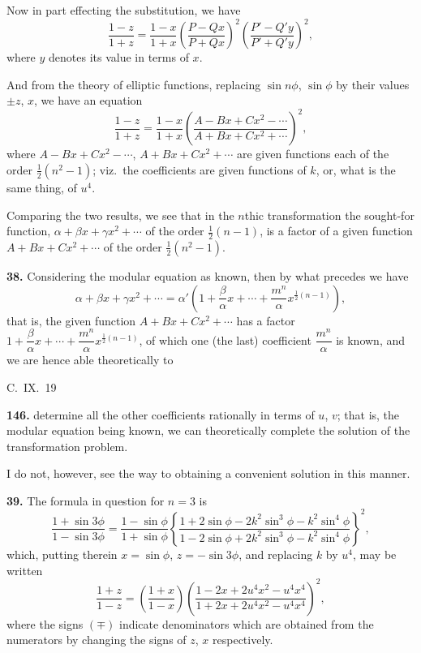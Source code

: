 \documentclass[11pt,a4paper]{article}
\theoremstyle{plain}
\begin{document}
Now in part effecting the substitution, we have
\[
\frac{1 - z}{1 + z} = \frac{1 - x}{1 + x}\left(\frac{P - Qx}{P + Qx}\right)^2\left(\frac{P' - Q'y}{P' + Q'y}\right)^2,
\]
where $y$ denotes its value in terms of $x$.

And from the theory of elliptic functions, replacing $\sin n\phi$, $\sin\phi$ by their values $\pm z$, $x$, we have an equation
\[
\frac{1 - z}{1 + z} = \frac{1 - x}{1 + x}\left(\frac{A - Bx + Cx^2 - \cdots}{A + Bx + Cx^2 + \cdots}\right)^2,
\]
where $A - Bx + Cx^2 - \cdots$, $A + Bx + Cx^2 + \cdots$ are given functions each of the order $\frac{1}{2}(n^2 - 1)$; viz.\ the coefficients are given functions of $k$, or, what is the same thing, of $u^4$.

Comparing the two results, we see that in the $n$thic transformation the sought-for function, $\alpha + \beta x + \gamma x^2 + \cdots$ of the order $\frac{1}{2}(n - 1)$, is a factor of a given function $A + Bx + Cx^2 + \cdots$ of the order $\frac{1}{2}(n^2 - 1)$.

\medskip
\noindent\textbf{38.} Considering the modular equation as known, then by what precedes we have
\[
\alpha + \beta x + \gamma x^2 + \cdots = \alpha'\left(1 + \frac{\beta}{\alpha}x + \cdots + \frac{m^n}{\alpha}x^{\frac{1}{2}(n-1)}\right),
\]
that is, the given function $A + Bx + Cx^2 + \cdots$ has a factor $1 + \dfrac{\beta}{\alpha}x + \cdots + \dfrac{m^n}{\alpha}x^{\frac{1}{2}(n-1)}$, of which one (the last) coefficient $\dfrac{m^n}{\alpha}$ is known, and we are hence able theoretically to

\begin{flushright}
C.~IX.~19
\end{flushright}


\noindent\textbf{146.} determine all the other coefficients rationally in terms of $u$, $v$; that is, the modular equation being known, we can theoretically complete the solution of the transformation problem.

I do not, however, see the way to obtaining a convenient solution in this manner.

\medskip
\noindent\textbf{39.} The formula in question for $n = 3$ is
\[
\frac{1 + \sin 3\phi}{1 - \sin 3\phi} = \frac{1 - \sin\phi}{1 + \sin\phi}\left\{\frac{1 + 2\sin\phi - 2k^2\sin^3\phi - k^2\sin^4\phi}{1 - 2\sin\phi + 2k^2\sin^3\phi - k^2\sin^4\phi}\right\}^2,
\]
which, putting therein $x = \sin\phi$, $z = -\sin 3\phi$, and replacing $k$ by $u^4$, may be written
\[
\frac{1 + z}{1 - z} = \left(\frac{1 + x}{1 - x}\right)\left(\frac{1 - 2x + 2u^4x^2 - u^4x^4}{1 + 2x + 2u^4x^2 - u^4x^4}\right)^2,
\]
where the signs $(\mp)$ indicate denominators which are obtained from the numerators by changing the signs of $z$, $x$ respectively.
\end{document}
